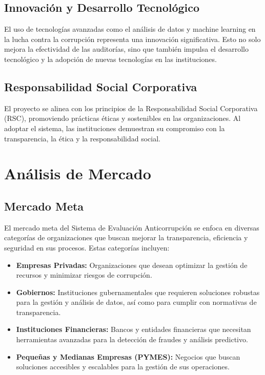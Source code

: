 \documentclass[a4paper,12pt]{article}
\begin{document}
\subsection{Innovación y Desarrollo Tecnológico}
El uso de tecnologías avanzadas como el análisis de datos y machine learning en la lucha contra la corrupción representa una innovación significativa. Esto no solo mejora la efectividad de las auditorías, sino que también impulsa el desarrollo tecnológico y la adopción de nuevas tecnologías en las instituciones.

\subsection{Responsabilidad Social Corporativa}
El proyecto se alinea con los principios de la Responsabilidad Social Corporativa (RSC), promoviendo prácticas éticas y sostenibles en las organizaciones. Al adoptar el sistema, las instituciones demuestran su compromiso con la transparencia, la ética y la responsabilidad social.


\section{Análisis de Mercado}
\subsection{Mercado Meta}
El mercado meta del Sistema de Evaluación Anticorrupción se enfoca en diversas categorías de organizaciones que buscan mejorar la transparencia, eficiencia y seguridad en sus procesos. Estas categorías incluyen:

\begin{itemize}
    \item \textbf{Empresas Privadas:} Organizaciones que desean optimizar la gestión de recursos y minimizar riesgos de corrupción.
    \item \textbf{Gobiernos:} Instituciones gubernamentales que requieren soluciones robustas para la gestión y análisis de datos, así como para cumplir con normativas de transparencia.
    \item \textbf{Instituciones Financieras:} Bancos y entidades financieras que necesitan herramientas avanzadas para la detección de fraudes y análisis predictivo.
    \item \textbf{Pequeñas y Medianas Empresas (PYMES):} Negocios que buscan soluciones accesibles y escalables para la gestión de sus operaciones.
\end{itemize}
\end{document}
